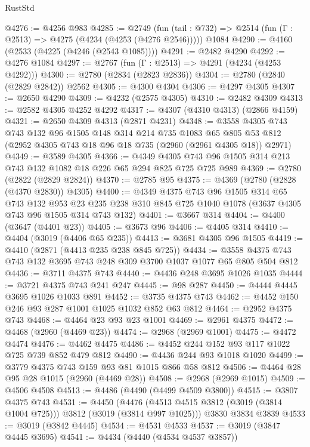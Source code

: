 \begin{lexlean}{RustStd}
\begin{coremodule}
@4276 := @4256 @983
@4285 := @2749
    (fun (tail : @732) => @2514 (fun (Γ : @2513) => @4275 (@4234 (@4253 (@4276 @2546)))))
    @1084
@4290 := @4160 (@2533 (@4225 (@4246 (@2543 @1085))))
@4291 := @2482 @4290
@4292 := @4276 @1084
@4297 := @2767 (fun (Γ : @2513) => @4291 (@4234 (@4253 @4292)))
@4300 := @2780 (@2834 (@2823 @2836))
@4304 := @2780 (@2840 (@2829 @2842)) @2562
@4305 := @4300 @4304
@4306 := @4297 @4305
@4307 := @2650 @4290
@4309 := @4232 (@2575 @4305)
@4310 := @2482 @4309
@4313 := @2582 @4305 @4252 @4292
@4317 := @4307 (@4310 @4313) (@2866 @4159)
@4321 := @2650 @4309 @4313 (@2871 @4231)
@4348 := @3558
    @4305
    @743
    @743
    @132
    @96
    @1505
    @148
    @314
    @214
    @735
    @1083
    @65
    @805
    @53
    @812
    (@2952 @4305 @743 @18 @96 @18 @735 (@2960 (@2961 @4305 @18)) @2971)
@4349 := @3589 @4305
@4366 := @4349 @4305 @743 @96 @1505 @314 @213 @743 @132 @1082 @18 @226 @65 @294 @825 @725 @725 @989
@4369 := @2780 (@2822 (@2829 @2824))
@4370 := @2785 @95
@4375 := @4369 (@2780 (@2828 (@4370 @2830)) @4305)
@4400 := @4349
    @4375
    @743
    @96
    @1505
    @314
    @65
    @743
    @132
    @953
    @23
    @235
    @238
    @310
    @845
    @725
    @1040
    @1078
    (@3637 @4305 @743 @96 @1505 @314 @743 @132)
@4401 := @3667 @314
@4404 := @4400 (@3647 (@4401 @23))
@4405 := @3673 @96
@4406 := @4405 @314
@4410 := @4404 (@3019 (@4406 @65 @235))
@4413 := @3681 @4305 @96 @1505
@4419 := @4410 (@2871 (@4413 @235 @238 @845 @725))
@4434 := @3558 @4375 @743 @743 @132 @3695 @743 @248 @309 @3700 @1037 @1077 @65 @805 @504 @812
@4436 := @3711 @4375 @743
@4440 := @4436 @248 @3695 @1026 @1035
@4444 := @3721 @4375 @743 @241 @247
@4445 := @98 @287
@4450 := @4444 @4445 @3695 @1026 @1033 @891
@4452 := @3735 @4375 @743
@4462 := @4452 @150 @246 @93 @287 @1001 @1025 @1032 @852 @63 @812
@4464 := @2952 @4375 @743
@4468 := @4464 @23 @93 @23 @1001
@4469 := @2961 @4375
@4472 := @4468 (@2960 (@4469 @23))
@4474 := @2968 (@2969 @1001)
@4475 := @4472 @4474
@4476 := @4462 @4475
@4486 := @4452 @244 @152 @93 @117 @1022 @725 @739 @852 @479 @812
@4490 := @4436 @244 @93 @1018 @1020
@4499 := @3779 @4375 @743 @159 @93 @81 @1015 @866 @58 @812
@4506 := @4464 @28 @95 @28 @1015 (@2960 (@4469 @28))
@4508 := @2968 (@2969 @1015)
@4509 := @4506 @4508
@4513 := @4486 (@4490 (@4499 @4509 @3800))
@4515 := @3807 @4375 @743
@4531 := @4450
    (@4476 (@4513 @4515 @3812 (@3019 (@3814 @1004 @725))) @3812 (@3019 (@3814 @997 @1025)))
    @3830
    @3834
    @3839
@4533 := @3019 (@3842 @4445)
@4534 := @4531 @4533
@4537 := @3019 (@3847 @4445 @3695)
@4541 := @4434 (@4440 (@4534 @4537 @3857))

\end{coremodule}
\end{lexlean}
